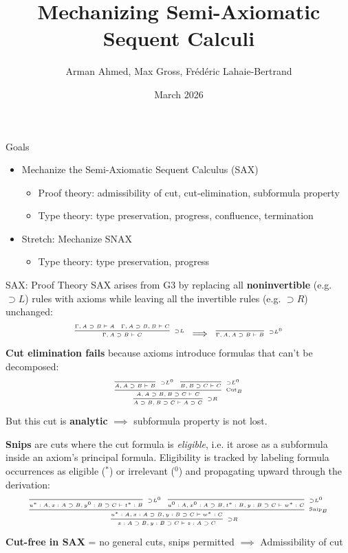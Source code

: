 \documentclass[9ps]{beamer}
\title{Mechanizing Semi-Axiomatic Sequent Calculi}
\author{Arman Ahmed, Max Gross, Fr\'{e}d\'{e}ric Lahaie-Bertrand}
\date{March 2026}
\begin{document}
\maketitle

\begin{frame}{Goals}
\begin{itemize}
\item Mechanize the Semi-Axiomatic Sequent Calculus (SAX) \cite{DeYoung2020}
  \begin{itemize}
  \item Proof theory: admissibility of cut, cut-elimination, subformula property
  \item Type theory: type preservation, progress, confluence, termination 
  \end{itemize}
\item Stretch: Mechanize SNAX \cite{DeYoungP23}
  \begin{itemize}
  \item Type theory: type preservation, progress
  \end{itemize}
\end{itemize}  
\end{frame}

\begin{frame}{SAX: Proof Theory}
\scriptsize
SAX arises from G3 by replacing all \textbf{noninvertible} (e.g. ${\supset}L$)
rules with axioms while leaving all the invertible rules (e.g. ${\supset}R$)
unchanged:
\[\tiny
  \infer[{\supset}L]{\Gamma, A \supset B \vdash C}{
    \Gamma, A \supset B \vdash A \quad
    \Gamma, A \supset B, B \vdash C
  }
  \;\;\Longrightarrow\;\;
  \infer[{\supset}L^0]{\Gamma, A, A \supset B \vdash B}{}
\]
\textbf{Cut elimination fails} because axioms introduce formulas that can't be
decomposed:
\[\tiny
  \infer[{\supset}R]{A \supset B, B \supset C \vdash A \supset C}{
    \infer[\text{Cut}_B]{A, A \supset B, B \supset C \vdash C}{
      \infer[{\supset}L^0]{A, A \supset B \vdash B}{} &
      \infer[{\supset}L^0]{B, B \supset C \vdash C}{}
    }
  }
\]
But this cut is \textbf{analytic} $\implies$ subformula property is not lost.

\medskip
\textbf{Snips} are cuts where the cut formula is \emph{eligible}, i.e. it arose
as a subformula inside an axiom's principal formula. Eligibility is tracked by
labeling formula occurrences as eligible ($^*$) or irrelevant ($^0$) and
propagating upward through the derivation:
\[\tiny
  \infer[{\supset}R]{x:A \supset B, y:B \supset C \vdash z:A \supset C}{
    \infer[\text{Snip}_B]{u^*:A, x:A \supset B, y:B \supset C \vdash w^*:C}{
      \infer[{\supset}L^0]{u^*:A, x:A \supset B, y^0:B \supset C \vdash t^*:B}{} &
      \infer[{\supset}L^0]{u^0:A, x^0:A \supset B, t^*:B, y:B \supset C \vdash w^*:C}{}
    }
  }
\]
\textbf{Cut-free in SAX} = no general cuts, snips permitted $\implies$ 
Admissibility of cut
\bigskip
\end{frame}
\end{document}
